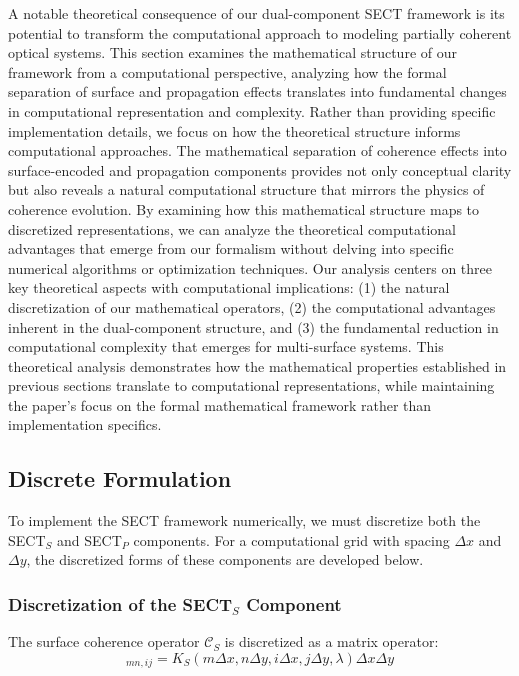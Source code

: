 \documentclass[a4paper,12pt]{article}
\begin{document}
A notable theoretical consequence of our dual-component SECT framework is its potential to transform the computational 
approach to modeling partially coherent optical systems. 
This section examines the mathematical structure of our framework from a computational perspective, analyzing 
how the formal separation of surface and propagation effects translates into fundamental changes in 
computational representation and complexity. 
Rather than providing specific implementation details, we focus on how the theoretical structure informs computational 
approaches.
The mathematical separation of coherence effects into surface-encoded and propagation components provides not 
only conceptual clarity but also reveals a natural computational structure that mirrors the physics 
of coherence evolution. By examining how this mathematical structure maps to discretized representations, we 
can analyze the theoretical computational advantages that emerge from our formalism without delving into specific 
numerical algorithms or optimization techniques.
Our analysis centers on three key theoretical aspects with computational implications: (1) the natural discretization 
of our mathematical operators, (2) the computational advantages inherent in the dual-component structure, 
and (3) the fundamental reduction in computational complexity that emerges for multi-surface systems. 
This theoretical analysis demonstrates how the mathematical properties established in previous sections 
translate to computational representations, while maintaining the paper's focus on the formal mathematical 
framework rather than implementation specifics.

\subsection{Discrete Formulation}

To implement the SECT framework numerically, we must discretize both the SECT$_S$ and SECT$_P$ components. For a computational grid with spacing $\Delta x$ and $\Delta y$, the discretized forms of these components are developed below.

\subsubsection{Discretization of the SECT$_S$ Component}

The surface coherence operator $\mathcal{C}_S$ is discretized as a matrix operator:
\begin{equation}
[\mathcal{C}_S]_{mn,ij} = K_S(m\Delta x, n\Delta y, i\Delta x, j\Delta y, \lambda) \Delta x \Delta y
\end{equation}
\end{document}
